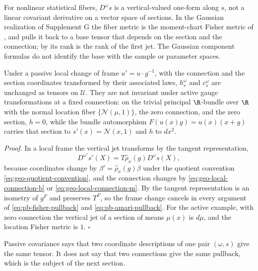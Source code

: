 For nonlinear statistical fibers, \(D^\omega s\) is a vertical-valued one-form along \(s\), not a
linear covariant derivative on a vector space of sections. In the Gaussian realization of
Supplement G the fiber metric is the moment-chart Fisher metric of ,
and  pulls it back to a base tensor that depends on the section
and the connection; by  its rank is the rank of the first jet.
The Gaussian component formulas do not identify the base with the sample or parameter spaces.

Under a passive local change of frame \(u'=u\cdot g^{-1}\), with the connection and the section
coordinates transformed by their associated laws, \(h_s^\omega\) and \(c_s^\omega\) are unchanged as
tensors on \(\mathcal U\). They are not invariant under active gauge transformations at a fixed
connection: on the trivial principal \(\R\)-bundle over \(\R\) with the normal location fiber
\(\{\mathcal N(\mu,1)\}\), the zero connection, and the zero section, \(h=0\), while the bundle
automorphism \(F(u(x)g)=u(x)(x+g)\) carries that section to \(s'(x)=\mathcal N(x,1)\) and \(h\) to
\(dx^2\). 

\noindent\emph{Proof.}
In a local frame the vertical jet transforms by the tangent representation,
\begin{equation}
D^{\omega'}s'(X)
=T\widehat\rho_x(g)D^\omega s(X),
\label{eq:pb-covariant-jet-gauge-law}
\end{equation}
because coordinates change by \(\beta'=\widehat\rho_x(g)\beta\) under the quotient convention
\eqref{eq:geo-quotient-convention}, and the connection changes by \eqref{eq:geo-local-connection-b}
or \eqref{eq:geo-local-connection-m}. By  the tangent
representation is an isometry of \(g^F\) and preserves \(T^F\), so the frame change cancels in every
argument of \eqref{eq:pb-fisher-pullback} and \eqref{eq:pb-amari-pullback}. For the active example,
with zero connection the vertical jet of a section of means \(\mu(x)\) is \(d\mu\), and the location
Fisher metric is \(1\). \hfill$\square$

Passive covariance says that two coordinate descriptions of one pair \((\omega,s)\) give the same
tensor. It does not say that two connections give the same pullback, which is the subject of the
next section.

